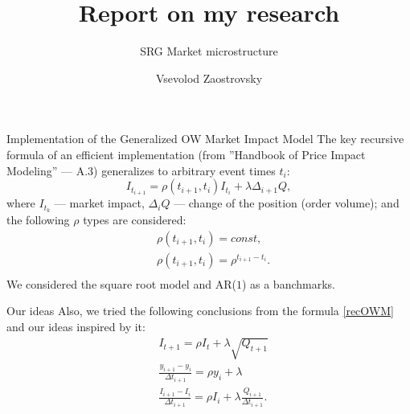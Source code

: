 \documentclass[aspectratio=169]{beamer}
\title{Report on my research}
\subtitle{SRG Market microstructure}
\author{Vsevolod Zaostrovsky}
\institute{Vega Institute Foundation}
\begin{document}
\maketitle

\begin{frame}{Implementation of the Generalized OW Market Impact Model}
    The key recursive formula of an efficient implementation (from ''Handbook of Price
    Impact Modeling'' --- A.3) generalizes to arbitrary event times $t_i$:
    \begin{equation} \label{recOWM}
        I_{t_{i+1}} = \rho (t_{i + 1}, t_i) I_{t_i} + \lambda \Delta_{i + 1} Q,
    \end{equation}
    where $I_{t_k}$ --- market impact, $\Delta_{i} Q$ --- change of the position (order volume); and the following $\rho$ types are considered:
    \begin{align*}
        & \rho (t_{i + 1}, t_i) = const,                                 \\
        & \rho  (t_{i + 1}, t_i) = \rho ^{t_{i + 1} - t_i}.             \\
    \end{align*}
    We considered the square root model and AR($1$) as a banchmarks.

\end{frame}

\begin{frame}{Our ideas}
    Also, we tried the following conclusions from the formula \eqref{recOWM} and our ideas inspired by it:
    \begin{align*}
        & I_{t+1} = \rho I_t + \lambda \sqrt{Q_{t+1}}                               \\
        & \frac{y_{i + 1} - y_{i}}{\Delta t_{i+1}} = \rho y_i + \lambda             \\
        & \frac{I_{i+1} - I_i}{\Delta t _{i+1}} = \rho I_i + \lambda \frac{Q_{i+1}}{\Delta t _{i+1}}.            \\
    \end{align*}

\end{frame}
\end{document}
